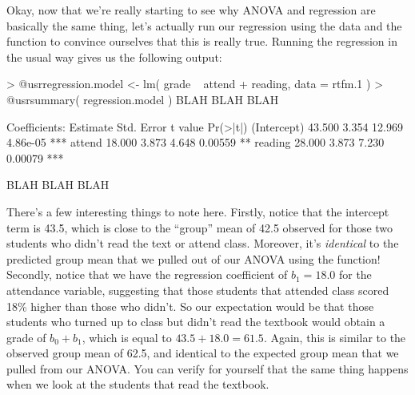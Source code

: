 Okay, now that we're really starting to see why ANOVA and regression are basically the same thing, let's actually run our regression using the  data and the  function to convince ourselves that this is really true. Running the regression in the usual way gives us the following output:
\begin{rblock1}
> @usr{regression.model <- lm( grade ~ attend + reading, data = rtfm.1 )}
> @usr{summary( regression.model )}
BLAH BLAH BLAH 

Coefficients:
            Estimate Std. Error t value Pr(>|t|)    
(Intercept)   43.500      3.354  12.969 4.86e-05 ***
attend        18.000      3.873   4.648  0.00559 ** 
reading       28.000      3.873   7.230  0.00079 ***

BLAH BLAH BLAH
\end{rblock1}
There's a few interesting things to note here. Firstly, notice that the intercept term is 43.5, which is close to the ``group'' mean of 42.5 observed for those two students who didn't read the text or attend class. Moreover, it's {\it identical} to the predicted group mean that we pulled out of our ANOVA using the  function! Secondly, notice that we have the regression coefficient of $b_1 = 18.0$ for the attendance variable, suggesting that those students that attended class scored 18\% higher than those who didn't. So our expectation would be that those students who turned up to class but didn't read the textbook would obtain a grade of $b_0 + b_1$, which is equal to $43.5 + 18.0 = 61.5$. Again, this is similar to the observed group mean of 62.5, and identical to the expected group mean that we pulled from our ANOVA. You can verify for yourself that the same thing happens when we look at the students that read the textbook.

